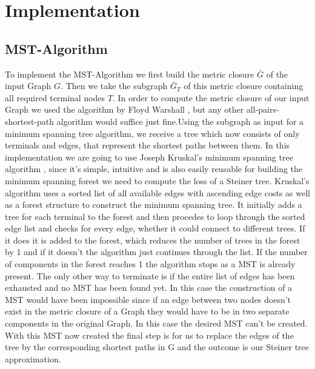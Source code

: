 
\chapter{Implementation}\label{chapter:implementation}

\section{MST-Algorithm}

To implement the MST-Algorithm we first build the metric closure $\bar{G}$ of the input Graph $G$. Then we take the subgraph $\bar{G}_T$ of this metric closure containing all required terminal nodes $T$. In order to compute the metric closure of our input Graph we used the algorithm by Floyd Warshall \cite{hougardy2010floyd}, but any other all-pairs-shortest-path algorithm would suffice just fine.Using the subgraph as input for a minimum spanning tree algorithm, we receive a tree which now consists of only terminals and edges, that represent the shortest paths between them. In this implementation we are going to use Joseph Kruskal's minimum spanning tree algorithm \cite{kruskal1956shortest}, since it's simple, intuitive and is also easily reusable for building the minimum spanning forest we need to compute the loss of a Steiner tree. Kruskal's algorithm uses a sorted list of all available edges with ascending edge costs as well as a forest structure to construct the minimum spanning tree. It initially adds a tree for each terminal to the forest and then procedes to loop through the sorted edge list and checks for every edge, whether it could connect to different trees. If it does it is added to the forest, which reduces the number of trees in the forest by 1 and if it doesn't the algorithm just continues through the list. If the number of components in the forest reaches 1 the algorithm stops as a MST is already present. The only other way to terminate is if the entire list of edges has been exhausted and no MST has been found yet. In this case the construction of a MST would have been impossible since if an edge between two nodes doesn't exist in the metric closure of a Graph they would have to be in two separate components in the original Graph. In this case the desired MST can't be created. With this MST now created the final step is for us to replace the edges of the tree by the corresponding shortest paths in G and the outcome is our Steiner tree approximation.

